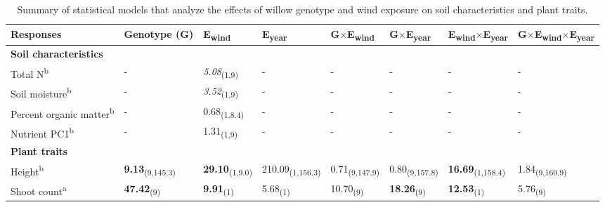 \documentclass[11pt]{article}
\begin{document}
\begin{table}
\centering
\caption{Summary of statistical models that analyze the
effects of willow genotype and wind exposure on
soil characteristics and plant traits.}
\label{my-label}
\begin{tabular}{llllllll}
\toprule
Responses                  & Genotype (G)  & E\textsubscript{wind}        & E\textsubscript{year}           & G$\times$E\textsubscript{wind}       & G$\times$E\textsubscript{year}       & E\textsubscript{wind}$\times$E\textsubscript{year}    & G$\times$E\textsubscript{wind}$\times$E\textsubscript{year} \\
\midrule
\textbf{Soil characteristics}       &               &              &                 &               &               &                &               \\
Total N\textsuperscript{b}                   & -             & \textit{5.08}\textsubscript{(1,9)}    & -               & -             & -             & -              & -             \\
Soil moisture\textsuperscript{b}             & -             & \textit{3.52}\textsubscript{(1,9)}    & -               & -             & -             & -              & -             \\
Percent organic matter\textsuperscript{b}    & -             & 0.68\textsubscript{(1,8.4)}  & -               & -             & -             & -              & -             \\
Nutrient PC1\textsuperscript{b}              & -             & 1.31\textsubscript{(1,9)}    & -               & -             & -             & -              & -             \\
\textbf{Plant traits}               &               &              &                 &               &               &                &               \\
Height\textsuperscript{b}                    & \textbf{9.13}\textsubscript{(9,145.3)} & \textbf{29.10}\textsubscript{(1,9.0)} & 210.09\textsubscript{(1,156.3)} & 0.71\textsubscript{(9,147.9)} & 0.80\textsubscript{(9,157.8)} & \textbf{16.69}\textsubscript{(1,158.4)} & 1.84\textsubscript{(9,160.9)} \\
Shoot count\textsuperscript{a}               & \textbf{47.42}\textsubscript{(9)}      & \textbf{9.91}\textsubscript{(1)}      & 5.68\textsubscript{(1)}         & 10.70\textsubscript{(9)}      & \textbf{18.26}\textsubscript{(9)}      & \textbf{12.53}\textsubscript{(1)}       & 5.76\textsubscript{(9)}       \\

\end{tabular}
\end{table}
\end{document}
